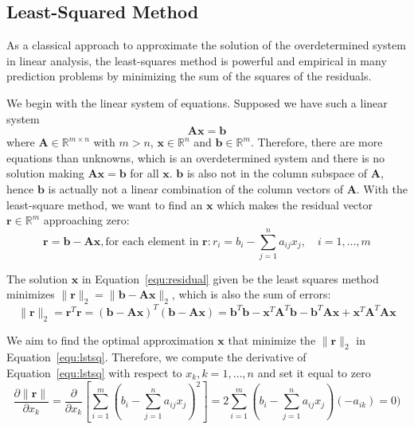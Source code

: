 \subsection{Least-Squared Method}
As a classical approach to approximate the solution of the overdetermined system in linear analysis, the least-squares method is powerful and empirical in many prediction problems by minimizing the sum of the squares of the residuals.~\citep{DB:10} 
\par We begin with the linear system of equations. Supposed we have such a linear system
\begin{equation}
    \mathbf{A}\mathbf{x} = \mathbf{b}
\end{equation}
where $\mathbf{A} \in \mathbb{R}^{m \times n}$ with $m > n$, $\mathbf{x} \in \mathbb{R}^n$ and $\mathbf{b} \in \mathbb{R}^{m}$. Therefore, there are more equations than unknowns, which is an overdetermined system and there is no solution making $\mathbf{A}\mathbf{x} = \mathbf{b}$ for all $\mathbf{x}$. $\mathbf{b}$ is also not in the column subspace of $\mathbf{A}$, hence $\mathbf{b}$ is actually not a linear combination of the column vectors of $\mathbf{A}$. With the least-square method, we want to find an $\mathbf{x}$ which makes the residual vector $\mathbf{r} \in \mathbb{R}^m$ approaching zero:
\begin{equation}
    \label{equ:residual}
    \mathbf{r} = \mathbf{b} - \mathbf{A}\mathbf{x}, \text{for each element in } \mathbf{r}:  r_i = b_i - \sum_{j=1}^{n} a_{i j} x_{j}, \quad i = 1, \dots, m
\end{equation}
\par The solution $\mathbf{x}$ in Equation~\ref{equ:residual} given be the least squares method minimizes $\|\mathbf{r}\|_2 = \|\mathbf{b} - \mathbf{A}\mathbf{x}\|_2$, which is also the sum of errors:
\begin{equation}
    \label{equ:lstsq}
    \|\mathbf{r}\|_2 = \mathbf{r}^{T} \mathbf{r}=(\mathbf{b}-\mathbf{A} \mathbf{x})^{T}(\mathbf{b}-\mathbf{A} \mathbf{x})=\mathbf{b}^{T} \mathbf{b}-\mathbf{x}^{T} \mathbf{A}^{T} \mathbf{b}-\mathbf{b}^{T} \mathbf{A} \mathbf{x}+\mathbf{x}^{T} \mathbf{A}^{T} \mathbf{A} \mathbf{x}
\end{equation}
\par We aim to find the optimal approximation $\mathbf{x}$ that minimize the $\|\mathbf{r}\|_2$ in Equation~\ref{equ:lstsq}. Therefore, we compute the derivative of Equation~\ref{equ:lstsq} with respect to $x_k, k = 1, \dots, n$ and set it equal to zero
\begin{equation}
    \label{equ:lstsq-gradient}
    \frac{\partial \|\mathbf{r}\|}{\partial x_{k}}=\frac{\partial}{\partial x_{k}}\left[\sum_{i=1}^{m}\left(b_{i}-\sum_{j=1}^{n} a_{i j} x_{j}\right)^{2}\right]=2 \sum_{i=1}^{m}\left(b_{i}-\sum_{j=1}^{n} a_{i j} x_{j}\right)\left(-a_{i k}\right)=0)
\end{equation}
